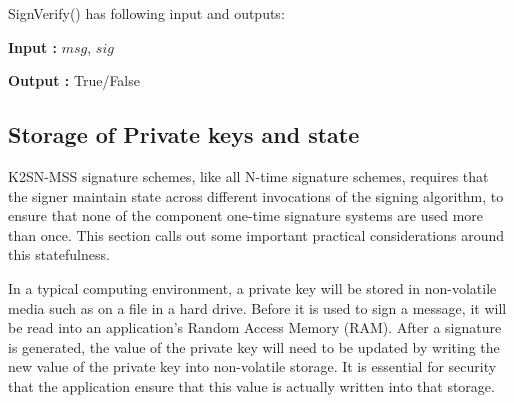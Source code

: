 SignVerify() has following input and outputs:

\textbf{Input : } $msg$, $sig$

\textbf{Output : } True/False



\subsection{Storage of Private keys and state}
K2SN-MSS signature schemes, like all N-time signature schemes, requires that the signer maintain state across different invocations of the signing algorithm, to ensure that none of the component one-time signature systems are used more than once. This section calls out some important practical considerations around this statefulness.

In a typical computing environment, a private key will be stored in non-volatile media such as on a file in a hard drive. Before it is used to sign a message, it will be read into an application's Random Access Memory (RAM). After a signature is generated, the value of the private key will need to be updated by writing the new value of the private key into non-volatile storage. It is essential for security that the application ensure that this value is actually written into that storage.


